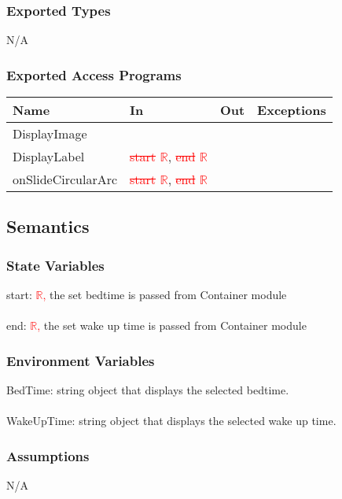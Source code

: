 \documentclass[12pt, titlepage]{article}
\begin{document}
\subsubsection{Exported Types}
N/A

\subsubsection{Exported Access Programs}

\begin{tabular}{| l | l | l | l |}
	\hline
	{\textbf{Name}} & {\textbf{In}} & {\textbf{Out}} & {\textbf{Exceptions}}\\
	\hline
	{DisplayImage} & & & \\
	\hline
	{DisplayLabel} & {\textcolor{red}{\sout{start}}} \textcolor{red}{\(\mathbb{R}\)}, {\textcolor{red}{\sout{end}}} \textcolor{red}{\(\mathbb{R}\)} & & \\
	\hline
	{onSlideCircularArc} & {\textcolor{red}{\sout{start}}} \textcolor{red}{\(\mathbb{R}\)}, {\textcolor{red}{\sout{end}}} \textcolor{red}{\(\mathbb{R}\)} & & \\
	\hline
\end{tabular}

\subsection{Semantics}

\subsubsection{State Variables}
start: \textcolor{red}{\(\mathbb{R}\), }the set bedtime is passed from Container module\\\\
end: \textcolor{red}{\(\mathbb{R}\), }the set wake up time is passed from Container module

\subsubsection{Environment Variables}
BedTime: string object that displays the selected bedtime.\\\\
WakeUpTime: string object that displays the selected wake up time.

\subsubsection{Assumptions}
N/A
\end{document}
